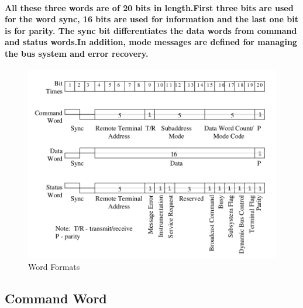 \documentclass[12pt,a4paper]{report}
\begin{document}
\paragraph{\textrm{\textmd {All these three words are of 20 bits in length.First three bits are used for the word sync, 16 bits are used for information and the last one bit is for parity. The sync bit differentiates the data words from command and status words.In addition, mode messages are defined for managing the bus system and error recovery.}}}
\begin{figure}[h]
	\centering
	\includegraphics[scale=.35]{word.png}
	\caption{Word Formats}
	\label{fig:word}
\end{figure}
\subsection{Command Word}
\end{document}

